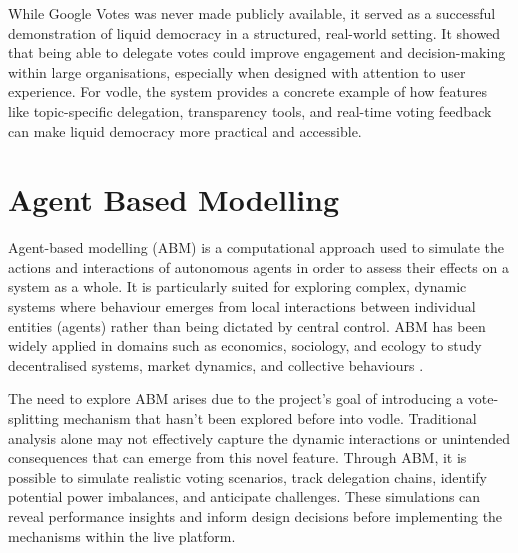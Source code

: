While Google Votes was never made publicly available, it served as a successful demonstration of liquid democracy in a structured, real-world setting. It showed that being able to delegate votes could improve engagement and decision-making within large organisations, especially when designed with attention to user experience. For vodle, the system provides a concrete example of how features like topic-specific delegation, transparency tools, and real-time voting feedback can make liquid democracy more practical and accessible.
\section{Agent Based Modelling}\label{sec:background_abm}
Agent-based modelling (ABM) is a computational approach used to simulate the actions and interactions of autonomous agents in order to assess their effects on a system as a whole. It is particularly suited for exploring complex, dynamic systems where behaviour emerges from local interactions between individual entities (agents) rather than being dictated by central control. ABM has been widely applied in domains such as economics, sociology, and ecology to study decentralised systems, market dynamics, and collective behaviours \citep{bonabeau2002agent}.

The need to explore ABM arises due to the project's goal of introducing a vote-splitting mechanism that hasn't been explored before into vodle. Traditional analysis alone may not effectively capture the dynamic interactions or unintended consequences that can emerge from this novel feature. Through ABM, it is possible to simulate realistic voting scenarios, track delegation chains, identify potential power imbalances, and anticipate challenges. These simulations can reveal performance insights and inform design decisions before implementing the mechanisms within the live platform.

